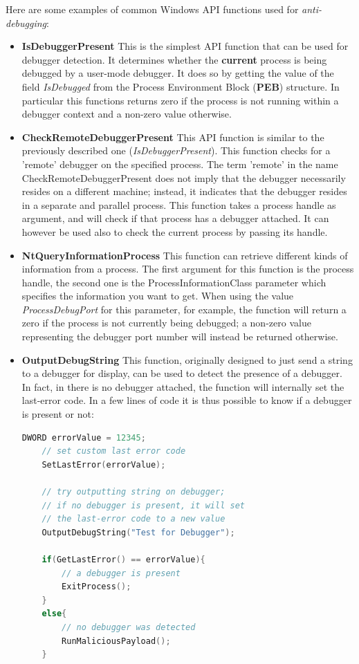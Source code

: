\documentclass[pdfa%
,cucitura%
]{toptesi}
\begin{document}
Here are some examples of common Windows API functions used for \textit{anti-debugging}:
\begin{itemize}
	\item \textbf{IsDebuggerPresent}
	This is the simplest API function that can be used for debugger detection. It determines whether the \textbf{current} process is being debugged by a user-mode debugger. It does so by getting the value of the field \textit{IsDebugged} from the Process Environment Block (\textbf{PEB}) structure. In particular this functions returns zero if the process is not running within a debugger context and a non-zero value otherwise.
	
	\item \textbf{CheckRemoteDebuggerPresent}
	This API function is similar to the previously described one (\textit{IsDebuggerPresent}). This function checks for a 'remote' debugger on the specified process. The term 'remote' in the name CheckRemoteDebuggerPresent does not imply that the debugger necessarily resides on a different machine; instead, it indicates that the debugger resides in a separate and parallel process. This function takes a process handle as argument, and will check if that process has a debugger attached. It can however be used also to check the current process by passing its handle.
	
	\item \textbf{NtQueryInformationProcess}
	This function can retrieve different kinds of information from a process. The first argument for this function is the process handle, the second one is the ProcessInformationClass parameter which specifies the information you want to get. When using the value \textit{ProcessDebugPort} for this parameter, for example, the function will return a zero if the process is not currently being debugged; a non-zero value representing the debugger port number will instead be returned otherwise.
	
	\item \textbf{OutputDebugString}
	This function, originally designed to just send a string to a debugger for display, can be used to detect the presence of a debugger. In fact, in there is no debugger attached, the function will internally set the last-error code. In a few lines of code it is thus possible to know if a debugger is present or not:
	
	\begin{lstlisting}[caption={OutputDebugString debugger detection}, label=code:OutputDebugString, language=C, style=mystyle]
	DWORD errorValue = 12345;
	// set custom last error code
	SetLastError(errorValue);
	
	// try outputting string on debugger;
	// if no debugger is present, it will set
	// the last-error code to a new value
	OutputDebugString("Test for Debugger");
	
	if(GetLastError() == errorValue){
		// a debugger is present
		ExitProcess();
	}
	else{
		// no debugger was detected
		RunMaliciousPayload();
	}
	\end{lstlisting}
	
\end{itemize}
\end{document}
